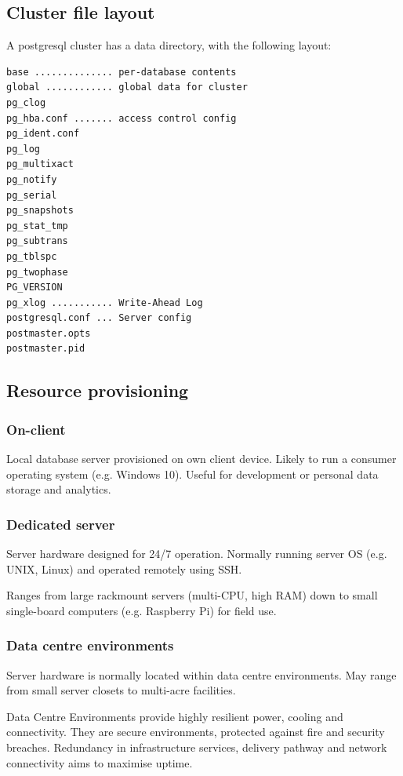 \documentclass[slides]{pgnotes}
\begin{document}
\subsection{Cluster file layout}

A postgresql cluster has a data directory, with the following layout:

\begin{verbatim}
base .............. per-database contents
global ............ global data for cluster
pg_clog
pg_hba.conf ....... access control config
pg_ident.conf
pg_log
pg_multixact
pg_notify
pg_serial
pg_snapshots
pg_stat_tmp
pg_subtrans
pg_tblspc
pg_twophase
PG_VERSION
pg_xlog ........... Write-Ahead Log
postgresql.conf ... Server config
postmaster.opts
postmaster.pid

\end{verbatim}


\subsection{Resource provisioning}

\subsubsection{On-client} 

Local database server provisioned on own client device.
Likely to run a consumer operating system (e.g. Windows 10). 
Useful for development or personal data storage and analytics.

\subsubsection{Dedicated server} 

Server hardware designed for 24/7 operation.
Normally running server OS (e.g. UNIX, Linux) and operated remotely using SSH.

Ranges from large rackmount servers (multi-CPU, high RAM) down to  small single-board computers (e.g. Raspberry Pi) for field use. 

\subsubsection{Data centre environments}

Server hardware is normally located within data centre environments.
May range from small server closets to multi-acre facilities.
 
Data Centre Environments provide highly resilient power, cooling and connectivity.
They are secure environments, protected against fire and security breaches.
Redundancy in infrastructure services, delivery pathway and network connectivity aims to maximise uptime.
\end{document}
